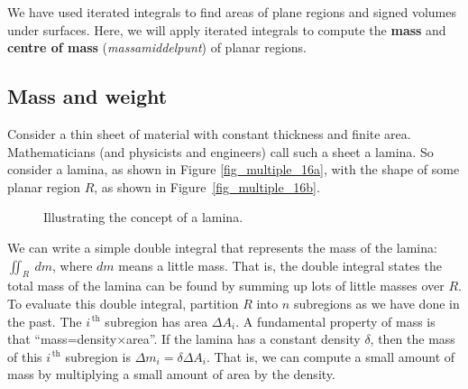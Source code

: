 We have used iterated integrals to find areas of plane regions and signed volumes under surfaces. Here, we will  apply iterated integrals to compute the \textbf{mass} and \textbf{centre of mass} (\textit{massamiddelpunt}) of planar regions.

\subsection{Mass and weight}
Consider a thin sheet of material with constant thickness and finite area. Mathematicians (and physicists and engineers) call such a sheet a lamina. So consider a lamina, as shown in Figure \ref{fig_multiple_16a},  with the shape of some planar region $R$, as shown in Figure~\ref{fig_multiple_16b}.

\begin{figure}
\centering
\qquad
{}
\caption{Illustrating the concept of a lamina.}
\end{figure}


We can write a simple double integral that represents the mass of the lamina: $\iint_R\ dm$, where $dm$ means a little mass. That is, the double integral states the total mass of the lamina can be found by summing up lots of little masses over $R$. To evaluate this double integral, partition $R$ into $n$ subregions as we have done in the past. The $i^{\,\text{th}}$ subregion has area $\Delta A_i$. 
A fundamental property of mass is that ``mass=density$\times$area''. If the lamina has a constant density $\delta$, then the mass of this $i^{\,\text{th}}$ subregion is $\Delta m_i=\delta\Delta A_i$. %
That is, we can compute a small amount of mass by multiplying a small amount of area by the density.

